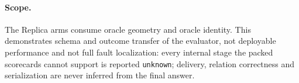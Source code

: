 \paragraph{Scope.}
The Replica arms consume oracle geometry and oracle identity. This demonstrates schema
and outcome transfer of the evaluator, not deployable performance and not full fault
localization: every internal stage the packed scorecards cannot support is reported
\texttt{unknown}; delivery, relation correctness and serialization are never inferred
from the final answer.
